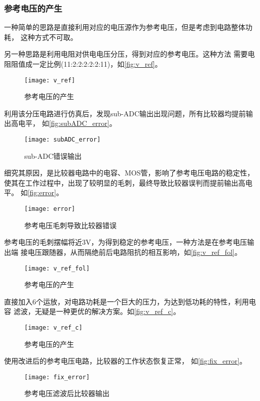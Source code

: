     \subsubsection{参考电压的产生}
    一种简单的思路是直接利用对应的电压源作为参考电压，但是考虑到电路整体功耗，
    这种方式不可取。
    \par 另一种思路是利用电阻对供电电压分压，得到对应的参考电压。这种方法
    需要电阻阻值成一定比例(11:2:2:2:2:2:11)，如\autoref{fig:v_ref}。
    \begin{figure}[H]
        \centering
        \texttt{[image: v\_ref]}
        \caption{\label{fig:v_ref}参考电压的产生}
    \end{figure}
    \par 利用该分压电路进行仿真后，发现sub-ADC输出出现问题，所有比较器均提前输出高电平，
    如\autoref{fig:subADC_error}。
    \begin{figure}[H]
        \centering
        \texttt{[image: subADC\_error]}
        \caption{\label{fig:subADC_error}sub-ADC错误输出}
    \end{figure}
    \par 细究其原因，是比较器电路中的电容、MOS管，影响了参考电压电路的稳定性，
    使其在工作过程中，出现了较明显的毛刺，最终导致比较器误判而提前输出高电平。
    如\autoref{fig:error}。
    \begin{figure}[H]
        \centering
        \texttt{[image: error]}
        \caption{\label{fig:error}参考电压毛刺导致比较器错误}
    \end{figure}
    \par 参考电压的毛刺摆幅将近3V，为得到稳定的参考电压，一种方法是在参考电压输出端
    接电压跟随器，从而隔绝前后电路阻抗的相互影响，如\autoref{fig:v_ref_fol}。
    \begin{figure}[H]
        \centering
        \texttt{[image: v\_ref\_fol]}
        \caption{\label{fig:v_ref_fol}参考电压的产生}
    \end{figure}
    \par 直接加入6个运放，对电路功耗是一个巨大的压力，为达到低功耗的特性，利用电容
    滤波，无疑是一种更优的解决方案。如\autoref{fig:v_ref_c}。
    \begin{figure}[H]
        \centering
        \texttt{[image: v\_ref\_c]}
        \caption{\label{fig:v_ref_c}参考电压的产生}
    \end{figure}
    \par 使用改进后的参考电压电路，比较器的工作状态恢复正常，
    如\autoref{fig:fix_error}。
    \begin{figure}[H]
        \centering
        \texttt{[image: fix\_error]}
        \caption{\label{fig:fix_error}参考电压滤波后比较器输出}
    \end{figure}

